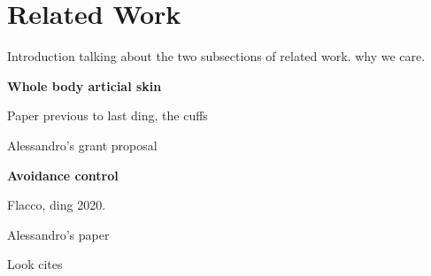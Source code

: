 \chapter{Related Work}
\label{relworkchap}


Introduction talking about the two subsections of related work. why we care.

\textbf{Whole body articial skin}

Paper previous to last ding, the cuffs

Alessandro's grant proposal

\textbf{Avoidance control}

Flacco, ding 2020.

Alessandro's paper

Look cites
